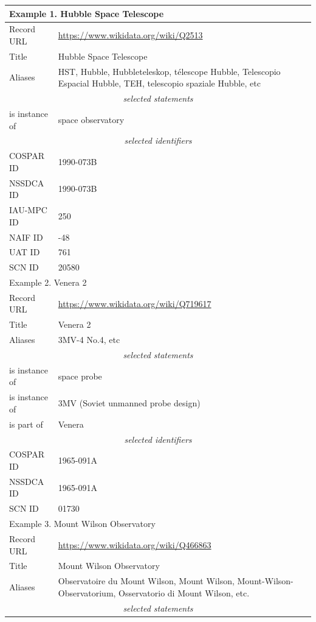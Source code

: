 \documentclass[11pt,a4paper]{ivoa}
\begin{document}
\noindent\begin{longtable}{p{}p{}}
\hline
\hline
\multicolumn{2}{l}{\bf Example 1. Hubble Space Telescope}\\
\hline
Record URL & \url{https://www.wikidata.org/wiki/Q2513}\\
Title      & Hubble Space Telescope \\
Aliases    & HST, Hubble, Hubbleteleskop, t\'elescope Hubble, Telescopio Espacial Hubble, TEH, telescopio spaziale Hubble, etc\\
\multicolumn{2}{c}{\sl selected statements}\\
is instance of & space observatory \\
\multicolumn{2}{c}{\sl selected identifiers}\\
COSPAR ID  & 1990-073B \\
NSSDCA ID  & 1990-073B \\
IAU-MPC ID & 250\\
NAIF ID    & -48\\
UAT ID     & 761\\
SCN ID     & 20580 \\
\hline
\hline
\multicolumn{2}{l}{Example 2. Venera 2}\\
\hline
Record URL & \url{https://www.wikidata.org/wiki/Q719617}\\
Title      & Venera 2\\
Aliases    & 3MV-4 No.4, etc\\
\multicolumn{2}{c}{\sl selected statements}\\
is instance of & space probe \\
is instance of & 3MV (Soviet unmanned probe design) \\
is part of     & Venera \\
\multicolumn{2}{c}{\sl selected identifiers}\\
COSPAR ID  & 1965-091A \\
NSSDCA ID  & 1965-091A \\
SCN ID     & 01730 \\
\hline
\hline
\multicolumn{2}{l}{Example 3. Mount Wilson Observatory}\\
\hline
Record URL & \url{https://www.wikidata.org/wiki/Q466863}\\
Title      & Mount Wilson Observatory\\
Aliases    & Observatoire du Mount Wilson, Mount Wilson, Mount-Wilson-Observatorium, Osservatorio di Mount Wilson, etc.\\
\multicolumn{2}{c}{\sl selected statements}\\

\end{longtable}
\end{document}
